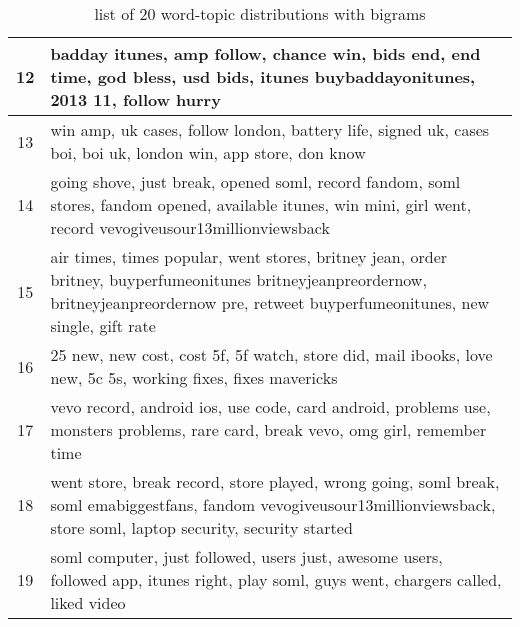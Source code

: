 \begin{table}
\begin{tabular}{c p{16cm}}
    12    & badday itunes, amp follow, chance win, bids end, end time, god bless, usd bids, itunes buybaddayonitunes, 2013 11, follow hurry \\ \midrule
    13    & win amp, uk cases, follow london, battery life, signed uk, cases boi, boi uk, london win, app store, don know \\ \midrule
    14    & going shove, just break, opened soml, record fandom, soml stores, fandom opened, available itunes, win mini, girl went, record vevogiveusour13millionviewsback \\ \midrule
    15    & air times, times popular, went stores, britney jean, order britney, buyperfumeonitunes britneyjeanpreordernow, britneyjeanpreordernow pre, retweet buyperfumeonitunes, new single, gift rate \\ \midrule
    16    & 25 new, new cost, cost 5f, 5f watch, store did, mail ibooks, love new, 5c 5s, working fixes, fixes mavericks \\ \midrule
    17    & vevo record, android ios, use code, card android, problems use, monsters problems, rare card, break vevo, omg girl, remember time \\ \midrule
    18    & went store, break record, store played, wrong going, soml break, soml emabiggestfans, fandom vevogiveusour13millionviewsback, store soml, laptop security, security started \\ \midrule
    19    & soml computer, just followed, users just, awesome users, followed app, itunes right, play soml, guys went, chargers called, liked video \\ \bottomrule
  \end{tabular}
  \caption{list of 20 word-topic distributions with bigrams}
  \label{tab:bigrams_lda}
\end{table}


